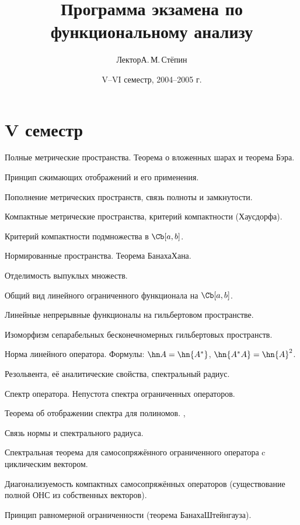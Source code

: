 \documentclass[a4paper]{article}
\title{Программа экзамена по функциональному анализу}
\author{Лектор\т А.\,М.\,Стёпин}
\date{V--VI семестр, 2004--2005 г.}
\begin{document}
\maketitle

\section*{V семестр}
\begin{nums}{-3}
\item Полные метрические пространства. Теорема о вложенных шарах и теорема Бэра. \cite[II, 3]{kf}
\item Принцип сжимающих отображений и его применения. \cite[II, 4]{kf}
\item Пополнение метрических пространств, связь полноты и замкнутости. \cite[II, 3]{kf}
\item Компактные метрические пространства, критерий компактности (Хаусдорфа). \cite[II, 7]{kf}
\item Критерий компактности подмножества в $\Cb[a,b]$. \cite[II, 7]{kf}
\item Нормированные пространства. Теорема Банаха\ч Хана. \cite[IV, 1]{ls}
\item Отделимость выпуклых множеств. \cite[IV, \S~1, п.~3]{kf}
\item Общий вид линейного ограниченного функционала на $\Cb[a,b]$. \cite{ls}
\item Линейные непрерывные функционалы на гильбертовом пространстве.
\item Изоморфизм сепарабельных бесконечномерных гильбертовых пространств. \cite{kf}
\item Норма линейного оператора. Формулы: $\hn A = \hn{A^*}$, $\hn{A^*A} = \hn{A}^2$.
\item Резольвента, её аналитические свойства, спектральный радиус. \cite[IV, 6]{kf}
\item Спектр оператора. Непустота спектра ограниченных операторов. \cite[V, 1]{kg}
\item Теорема об отображении спектра для полиномов. \cite[V, 1]{kg}, \cite[I том]{rs}
\item Связь нормы и спектрального радиуса. \cite[V, 1]{kf}
\item Спектральная теорема для самосопряжённого ограниченного оператора c циклическим вектором. \cite{rs}
\item Диагонализуемость компактных самосопряжённых операторов (существование полной ОНС из собственных векторов).
\item Принцип равномерной ограниченности (теорема Банаха\ч Штейнгауза). \cite[III, 4]{ls}

\end{nums}
\end{document}
